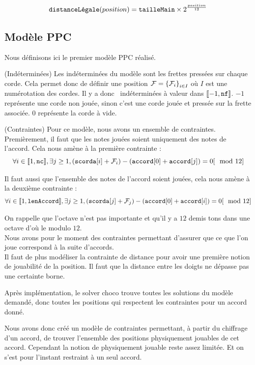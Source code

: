 \begin{equation}
  \label{eq:taille_frette}
  \dLegale(position) = \tailleMain\times 2^{\frac{position}{12}}
\end{equation}

\subsection{Modèle PPC}
\label{subsec:ModelePPC}

Nous définisons ici le premier modèle PPC réalisé.

\begin{defi}(Indéterminées)
  \label{def:IndetPremier}
  Les indéterminées du modèle sont les frettes pressées sur chaque corde. Cela
  permet donc de définir une position
  $\indetPremier = \accolades{\indetPremier_i}_{i\in I}$ où $I$ est une
  numérotation des cordes.
  Il y a donc \nbCordes \ indéterminées à valeur dans $\internat{-1, \nbFrettes}$.
  $-1$ représente une corde non jouée, sinon c'est une corde jouée et pressée
  sur la frette associée. $0$ représente la corde à vide.
\end{defi}

\begin{defi}(Contraintes)
  \label{def:ContraintesPremier}
  Pour ce modèle, nous avons un ensemble de contraintes. Premièrement, il faut
  que les notes jouées soient uniquement des notes de l'accord. Cela nous
  amène à la première contrainte :
  \begin{equation}
    \label{eq:played_in_chord}
    \forall i\in \internat{ 1, \nbCordes }, \exists j\geq 1,
    (\scordature[i]+\indetPremier_i)-(\accord[0]+\accord[j])
    = 0[\mod 12]
  \end{equation}

  Il faut aussi que l'ensemble des notes de l'accord soient jouées, cela nous
  amène à la deuxième contrainte :
  \begin{equation}
    \label{eq:chord_play}
      \forall i\in \internat{ 1,\lenAccord }, \exists j\geq 1,
      (\scordature[j]+\indetPremier_j)-(\accord[0]+\accord[i])
    = 0[\mod 12]
  \end{equation}
  
  On rappelle que l'octave n'est pas importante et qu'il y a $12$ demis tons
  dans une octave d'où le modulo $12$.\\
  Nous avons pour le moment des contraintes permettant d'assurer que ce que
  l'on joue correspond à la suite d'accords.\\
  Il faut de plus modéliser la contrainte de distance pour avoir une première
  notion de jouabilité de la position.
  Il faut que la distance entre les doigts ne dépasse pas une certainte borne.
\end{defi}

Après implémentation, le solver choco trouve toutes les solutions du modèle
demandé, donc toutes les positions qui respectent les contraintes pour un 
accord donné.

Nous avons donc créé un modèle de
contraintes permettant, à partir du chiffrage d'un accord, de trouver
l'ensemble des positions physiquement jouables de cet accord.
Cependant la notion de physiquement jouable reste assez limitée.
Et on s'est pour l'instant restraint à un seul accord.
\newpage
